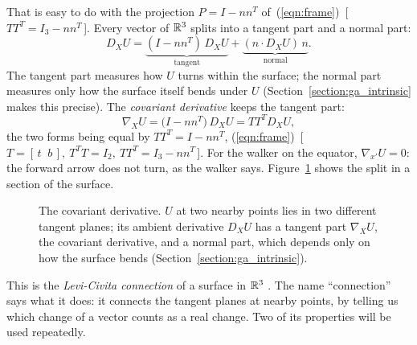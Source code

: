 That is easy to do with the projection $P = I - n n^T$ of~(\ref{eqn:frame})~[\,$TT^T = I_3 - nn^T$\,]. Every vector of $\mathbb{R}^3$ splits into a tangent part and a normal part:
\begin{equation*}
D_X U = \underbrace{(I - n n^T)\, D_X U}_{\text{tangent}} + \underbrace{(n\cdot D_X U)\, n}_{\text{normal}} .
\end{equation*}
The tangent part measures how $U$ turns within the surface; the normal part measures only how the surface itself bends under $U$ (Section~\ref{section:ga_intrinsic} makes this precise). The \emph{covariant derivative} keeps the tangent part:
\begin{equation}
\label{eqn:covariant}
\nabla_X U = \big( I - n n^T \big)\, D_X U = T T^T D_X U ,
\end{equation}
the two forms being equal by $T T^T = I - n n^T$, (\ref{eqn:frame})~[\,$T = [\,t\;\;b\,],\ T^TT = I_2,\ TT^T = I_3 - nn^T$\,]. For the walker on the equator, $\nabla_{x'} U = 0$: the forward arrow does not turn, as the walker says. Figure~\ref{fig:covariant} shows the split in a section of the surface.
\begin{figure}[t]
\centering
{}
\caption{The covariant derivative. $U$ at two nearby points lies in two different tangent planes; its ambient derivative $D_X U$ has a tangent part $\nabla_X U$, the covariant derivative, and a normal part, which depends only on how the surface bends (Section~\ref{section:ga_intrinsic}).}
\label{fig:covariant}
\end{figure}

This is the \emph{Levi-Civita connection} of a surface in $\mathbb{R}^3$ \cite{doCarmo1976}. The name ``connection'' says what it does: it connects the tangent planes at nearby points, by telling us which change of a vector counts as a real change. Two of its properties will be used repeatedly.

